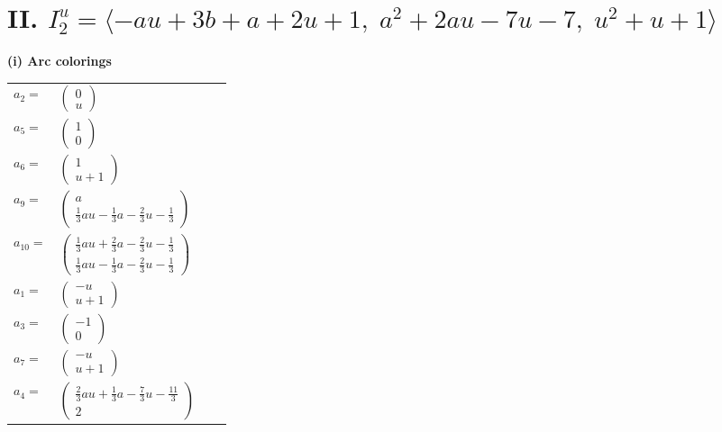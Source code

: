 \documentclass[1p]{elsarticle_modified}
\theoremstyle{definition}
\begin{document}
\centering \section*{II. $I^u_{2}= \langle - a u+3 b+a+2 u+1,\;a^2+2 a u-7 u-7,\;u^2+u+1 \rangle$}
\flushleft \textbf{(i) Arc colorings}\\
\begin{tabular}{m{7pt} m{180pt} m{7pt} m{180pt} }
\flushright $a_{2}=$&$\begin{pmatrix}0\\u\end{pmatrix}$ \\
\flushright $a_{5}=$&$\begin{pmatrix}1\\0\end{pmatrix}$ \\
\flushright $a_{6}=$&$\begin{pmatrix}1\\u+1\end{pmatrix}$ \\
\flushright $a_{9}=$&$\begin{pmatrix}a\\\frac{1}{3} a u-\frac{1}{3} a-\frac{2}{3} u-\frac{1}{3}\end{pmatrix}$ \\
\flushright $a_{10}=$&$\begin{pmatrix}\frac{1}{3} a u+\frac{2}{3} a-\frac{2}{3} u-\frac{1}{3}\\\frac{1}{3} a u-\frac{1}{3} a-\frac{2}{3} u-\frac{1}{3}\end{pmatrix}$ \\
\flushright $a_{1}=$&$\begin{pmatrix}- u\\u+1\end{pmatrix}$ \\
\flushright $a_{3}=$&$\begin{pmatrix}-1\\0\end{pmatrix}$ \\
\flushright $a_{7}=$&$\begin{pmatrix}- u\\u+1\end{pmatrix}$ \\
\flushright $a_{4}=$&$\begin{pmatrix}\frac{2}{3} a u+\frac{1}{3} a-\frac{7}{3} u-\frac{11}{3}\\2\end{pmatrix}$ \\

\end{tabular}
\end{document}
